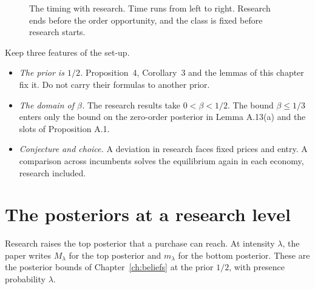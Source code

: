 \begin{figure}[ht]
\centering
{}
\caption{The timing with research. Time runs from left to right. Research ends before the order opportunity, and the
class is fixed before research starts.}
\label{fig:research-timeline}
\end{figure}

\begin{watchout}
Keep three features of the set-up.
\begin{itemize}
\item \emph{The prior is \(1/2\).} Proposition~4, Corollary~3 and the lemmas of this chapter fix it. Do not carry their
formulas to another prior.
\item \emph{The domain of \(\beta\).} The research results take \(0<\beta<1/2\). The bound \(\beta\le1/3\) enters only
the bound on the zero-order posterior in Lemma A.13(a) and the slots of Proposition A.1.
\item \emph{Conjecture and choice.} A deviation in research faces fixed prices and entry. A comparison across
incumbents solves the equilibrium again in each economy, research included.
\end{itemize}
\end{watchout}

\section{The posteriors at a research level}\label{sec:research-posteriors}

Research raises the top posterior that a purchase can reach. At intensity \(\lambda\), the paper writes \(M_\lambda\)
for the top posterior and \(m_\lambda\) for the bottom posterior. These are the posterior bounds of
Chapter~\ref{ch:beliefs} at the prior \(1/2\), with presence probability \(\lambda\).

